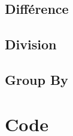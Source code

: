 \documentclass{article}
\begin{document}
\subsection{Différence}

\subsection{Division}

\subsection{Group By}

\clearpage

\section{Code}
\end{document}
